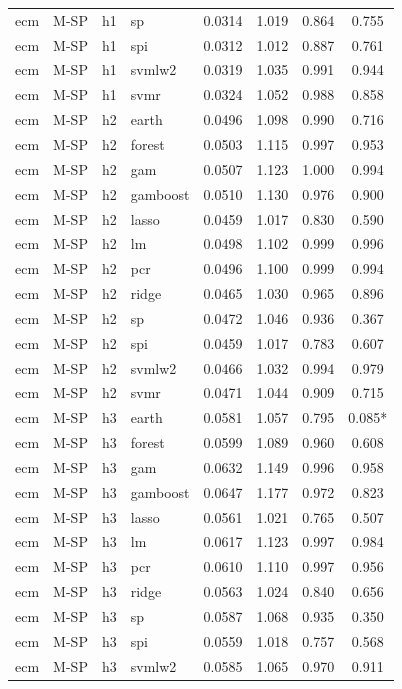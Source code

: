 \begin{ThreePartTable}
\begin{longtable}[t]{llclcccc}
ecm & M-SP & h1 & sp & 0.0314 & 1.019 & 0.864 & 0.755\\
ecm & M-SP & h1 & spi & 0.0312 & 1.012 & 0.887 & 0.761\\
ecm & M-SP & h1 & svmlw2 & 0.0319 & 1.035 & 0.991 & 0.944\\
ecm & M-SP & h1 & svmr & 0.0324 & 1.052 & 0.988 & 0.858\\
\addlinespace
ecm & M-SP & h2 & earth & 0.0496 & 1.098 & 0.990 & 0.716\\
ecm & M-SP & h2 & forest & 0.0503 & 1.115 & 0.997 & 0.953\\
ecm & M-SP & h2 & gam & 0.0507 & 1.123 & 1.000 & 0.994\\
ecm & M-SP & h2 & gamboost & 0.0510 & 1.130 & 0.976 & 0.900\\
ecm & M-SP & h2 & lasso & 0.0459 & 1.017 & 0.830 & 0.590\\
ecm & M-SP & h2 & lm & 0.0498 & 1.102 & 0.999 & 0.996\\
ecm & M-SP & h2 & pcr & 0.0496 & 1.100 & 0.999 & 0.994\\
ecm & M-SP & h2 & ridge & 0.0465 & 1.030 & 0.965 & 0.896\\
ecm & M-SP & h2 & sp & 0.0472 & 1.046 & 0.936 & 0.367\\
ecm & M-SP & h2 & spi & 0.0459 & 1.017 & 0.783 & 0.607\\
ecm & M-SP & h2 & svmlw2 & 0.0466 & 1.032 & 0.994 & 0.979\\
ecm & M-SP & h2 & svmr & 0.0471 & 1.044 & 0.909 & 0.715\\
\addlinespace
ecm & M-SP & h3 & earth & 0.0581 & 1.057 & 0.795 & 0.085*\\
ecm & M-SP & h3 & forest & 0.0599 & 1.089 & 0.960 & 0.608\\
ecm & M-SP & h3 & gam & 0.0632 & 1.149 & 0.996 & 0.958\\
ecm & M-SP & h3 & gamboost & 0.0647 & 1.177 & 0.972 & 0.823\\
ecm & M-SP & h3 & lasso & 0.0561 & 1.021 & 0.765 & 0.507\\
ecm & M-SP & h3 & lm & 0.0617 & 1.123 & 0.997 & 0.984\\
ecm & M-SP & h3 & pcr & 0.0610 & 1.110 & 0.997 & 0.956\\
ecm & M-SP & h3 & ridge & 0.0563 & 1.024 & 0.840 & 0.656\\
ecm & M-SP & h3 & sp & 0.0587 & 1.068 & 0.935 & 0.350\\
ecm & M-SP & h3 & spi & 0.0559 & 1.018 & 0.757 & 0.568\\
ecm & M-SP & h3 & svmlw2 & 0.0585 & 1.065 & 0.970 & 0.911\\

\end{longtable}
\end{ThreePartTable}

